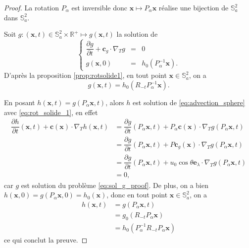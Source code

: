 \begin{proof}
La rotation $P_{\alpha}$ est inversible donc $\mathbf{x} \mapsto P_{\alpha} \mathbf{x}$ réalise une bijection de $\mathbb{S}_a^2$ dans $\mathbb{S}_a^2$.

Soit $g : (\mathbf{x},t) \in \mathbb{S}_a^2 \times \mathbb{R}^+ \mapsto g(\mathbf{x},t)$ la solution de 
\begin{equation}
\left\lbrace
\begin{array}{rcl}
\dfrac{\partial g}{\partial t} + \mathbf{c}_g \cdot \nabla_T g & = & 0\\
g(\mathbf{x},0) & = & h_0(P_{\alpha}^{-1}\mathbf{x}).
\end{array}
\right.
\label{eq:sol_g_proof}
\end{equation}
D'après la proposition \ref{prop:rotsolide1}, en tout point $\mathbf{x} \in \mathbb{S}_a^2$, on a
\begin{equation}
g(\mathbf{x},t) = h_0(R_{-t} P_{\alpha}^{-1}\mathbf{x}).
\end{equation}

En posant $h(\mathbf{x},t) = g(P_{\alpha} \mathbf{x} ,t)$, alors $h$ est solution de \eqref{eq:advection_sphere} avec \eqref{eq:rot_solide_1}, en effet
\begin{align*}
\dfrac{\partial h}{\partial t} (\mathbf{x},t) + \mathbf{c}(\mathbf{x}) \cdot \nabla_T h(\mathbf{x},t) & = \dfrac{\partial g}{\partial t} (P_{\alpha}\mathbf{x},t) + P_{\alpha} \mathbf{c}(\mathbf{x}) \cdot \nabla_T g (P_{\alpha}\mathbf{x},t) \\
	& = \dfrac{\partial g}{\partial t} (P_{\alpha}\mathbf{x},t) + P\mathbf{c}_g(\mathbf{x}) \cdot \nabla_T g (P_{\alpha}\mathbf{x},t) \\
	& = \dfrac{\partial g}{\partial t} (P_{\alpha}\mathbf{x},t) + u_0 \cos \theta \mathbf{e}_{\lambda} \cdot \nabla_T g (P_{\alpha}\mathbf{x},t) \\
	& = 0,
\end{align*}
car $g$ est solution du problème \eqref{eq:sol_g_proof}.
De plus, on a bien $h(\mathbf{x},0) = g(P_{\alpha} \mathbf{x} ,0) = h_0(\mathbf{x})$, donc en tout point $\mathbf{x} \in \mathbb{S}_a^2$, on a
\begin{align*}
h(\mathbf{x},t) & = g(P_{\alpha} \mathbf{x}, t) \\
	& = g_0(R_{-t} P_{\alpha} \mathbf{x} ) \\
	& = h_0(P_{\alpha}^{-1}R_{-t}P_{\alpha} \mathbf{x})
\end{align*}
ce qui conclut la preuve.
\end{proof}

